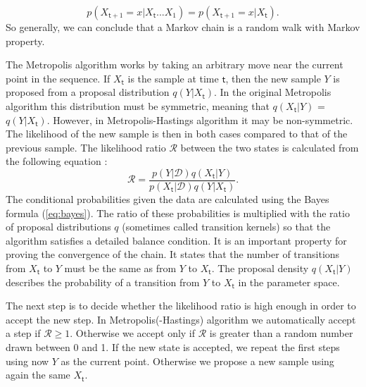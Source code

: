 \documentclass{wihuri}
\def\be{\begin{equation}}
\def\ee{\end{equation}}
\def\tstep{\mathsf{t}}
\def\lratio{\mathcal{R}}
\begin{document}
 \be \label{eq:markov_prop}
p(X_{\tstep +1} = x|X_{\tstep}. . . X_{1}) = p(X_{\tstep +1} = x|X_{\tstep}).
\ee
So generally, we can conclude that a Markov chain is a random walk with Markov property.
 
The Metropolis algorithm works by taking an arbitrary move near the current
point in the sequence. If $X_{\tstep}$ is the sample at time $\tstep$, then the new sample $Y$ is proposed from a proposal distribution $q(Y|X_{\tstep})$. In the original Metropolis algorithm this distribution must be symmetric, meaning that $q(X_{\tstep}|Y)$ = $q(Y|X_{\tstep})$. However, in Metropolis-Hastings algorithm it may be non-symmetric. The likelihood of the new sample is then in both cases compared to that of the previous sample. The likelihood ratio $\lratio$ between the two states is calculated from the following equation \cite{tuomi}:
\be \label{eq:likely_ratio} 
\lratio= \frac{p(Y|\mathcal{D})q(X_{\tstep}|Y)}{p(X_{\tstep}|\mathcal{D})q(Y|X_{\tstep})}.
\ee
The conditional probabilities given the data are calculated using the Bayes formula (\ref{eq:bayes}). The ratio of these probabilities is multiplied with the ratio of proposal distributions $q$ (sometimes called transition kernels) so that the algorithm satisfies a detailed balance condition. It is an important property for proving the convergence of the chain. It states that the number of transitions from $X_{\tstep}$ to $Y$ must be the same as from $Y$ to $X_{\tstep}$.  The proposal density $q(X_{\tstep}|Y)$ describes the probability of a transition from $Y$ to $X_{\tstep}$ in the parameter space.

The next step is to decide whether the likelihood ratio is high enough in order to accept the new step. In Metropolis(-Hastings) algorithm we automatically accept a step if $\lratio \ge 1$.  Otherwise we accept %
only if $\lratio$ is greater than a random number drawn between 0 and 1. If the new state is accepted, we repeat the first steps using now $Y$ as the current point. Otherwise we propose a new sample using again the same $X_{\tstep}$. 


\end{document}
